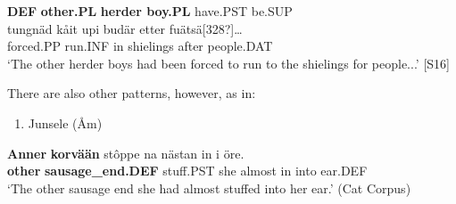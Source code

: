 \textbf{DEF} \textbf{other.PL} \textbf{herder boy.PL} have.PST  be.SUP\\ %


\ea\label{}
\gll tungnäd  kåit  upi  budär  etter  fuätsä[328?]…\\


forced.PP  run.INF  in  shielings  after  people.DAT\\ %


‘The other herder boys had been forced to run to the shielings for people...’ [S16]
\z

There are also other patterns, however, as in:

\begin{enumerate} %
\item 
Junsele (Åm)

\end{enumerate} %
\ea\label{}
\gll \textbf{Anner}\textbf{  korvään} stôppe  na  nästan  in  i  öre.\\


\textbf{other} \textbf{sausage\_end.DEF} stuff.PST  she  almost  in  into  ear.DEF\\ %


‘The other sausage end she had almost stuffed into her ear.’ (Cat Corpus)
\z


